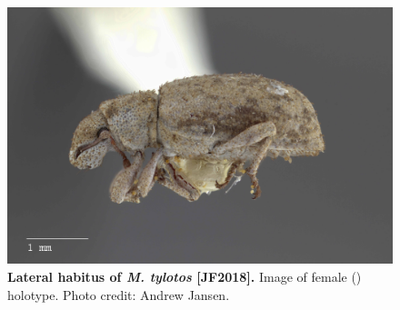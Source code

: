 \documentclass[fleqn,10pt,lineno]{wlpeerj} %
\begin{document}
\begin{figure}[h]
	\begin{sideways}
		\centering
		\includegraphics[height=\textwidth]{figure31.jpg}
	\end{sideways}
	\caption{\textbf{Lateral habitus of \textit{M. tylotos} [JF2018].} Image of female (\female) holotype. Photo credit: Andrew Jansen.}
	\label{fig:tylotos_F_lateral}
\end{figure}
\end{document}
